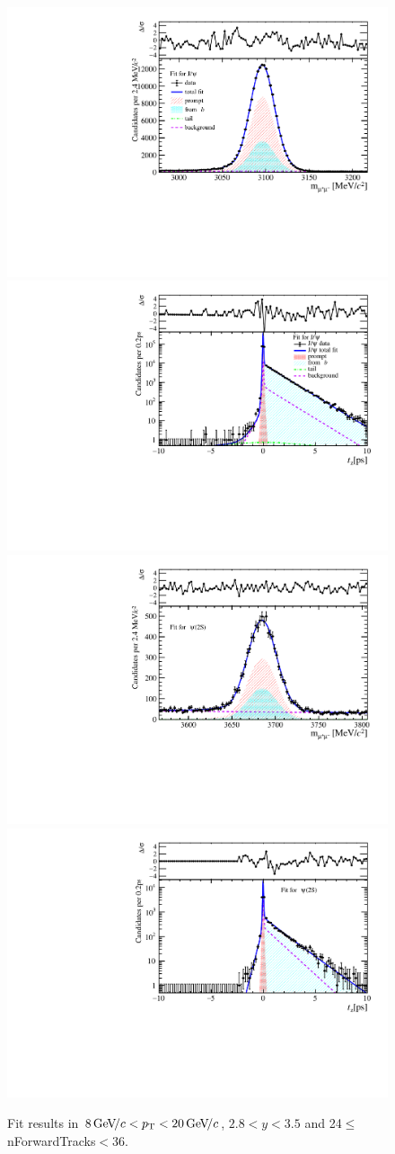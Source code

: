 \begin{figure}[H]
\begin{center}
\includegraphics[width=0.47\linewidth]{pdf/Jpsi/drawmassF/n3y2pt5.pdf}
\includegraphics[width=0.47\linewidth]{pdf/Jpsi/2DFitF/n3y2pt5.pdf}
\vspace*{-0.5cm}
\includegraphics[width=0.47\linewidth]{pdf/Psi2S/drawmassF/n3y2pt5.pdf}
\includegraphics[width=0.47\linewidth]{pdf/Psi2S/2DFitF/n3y2pt5.pdf}
\vspace*{-0.5cm}
\end{center}
\caption{Fit results in $8\text{\,Ge\kern -0.1em V\!/}c<p_{\mathrm{T}}<20\text{\,Ge\kern -0.1em V\!/}c$, $2.8<y<3.5$ and 24$\leq$nForwardTracks$<$36.}
\label{Fitn3y2pt5}
\end{figure}
